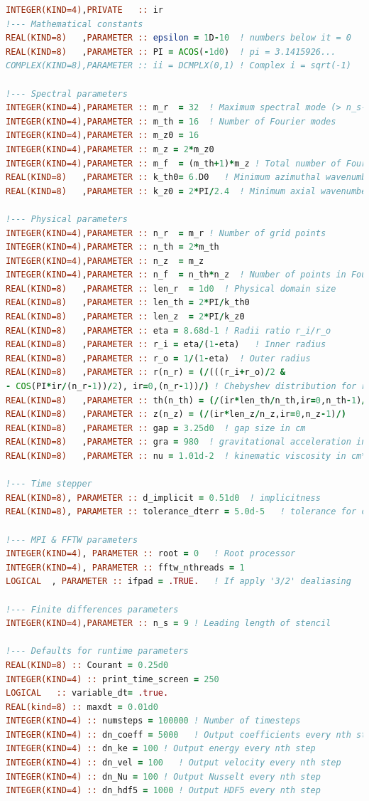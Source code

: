 \documentclass[a4paper, 11pt, DIV=11]{scrartcl}
\begin{document}
\begin{lstlisting}[language=Fortran]
INTEGER(KIND=4),PRIVATE   :: ir
!--- Mathematical constants
REAL(KIND=8)   ,PARAMETER :: epsilon = 1D-10  ! numbers below it = 0
REAL(KIND=8)   ,PARAMETER :: PI = ACOS(-1d0)  ! pi = 3.1415926...
COMPLEX(KIND=8),PARAMETER :: ii = DCMPLX(0,1) ! Complex i = sqrt(-1)

!--- Spectral parameters
INTEGER(KIND=4),PARAMETER :: m_r  = 32  ! Maximum spectral mode (> n_s-1)
INTEGER(KIND=4),PARAMETER :: m_th = 16  ! Number of Fourier modes
INTEGER(KIND=4),PARAMETER :: m_z0 = 16
INTEGER(KIND=4),PARAMETER :: m_z = 2*m_z0
INTEGER(KIND=4),PARAMETER :: m_f  = (m_th+1)*m_z ! Total number of Fourier modes
REAL(KIND=8)   ,PARAMETER :: k_th0= 6.D0   ! Minimum azimuthal wavenumber
REAL(KIND=8)   ,PARAMETER :: k_z0 = 2*PI/2.4  ! Minimum axial wavenumber

!--- Physical parameters
INTEGER(KIND=4),PARAMETER :: n_r  = m_r ! Number of grid points
INTEGER(KIND=4),PARAMETER :: n_th = 2*m_th
INTEGER(KIND=4),PARAMETER :: n_z  = m_z
INTEGER(KIND=4),PARAMETER :: n_f  = n_th*n_z  ! Number of points in Fourier directions
REAL(KIND=8)   ,PARAMETER :: len_r  = 1d0  ! Physical domain size
REAL(KIND=8)   ,PARAMETER :: len_th = 2*PI/k_th0
REAL(KIND=8)   ,PARAMETER :: len_z  = 2*PI/k_z0
REAL(KIND=8)   ,PARAMETER :: eta = 8.68d-1 ! Radii ratio r_i/r_o
REAL(KIND=8)   ,PARAMETER :: r_i = eta/(1-eta)   ! Inner radius
REAL(KIND=8)   ,PARAMETER :: r_o = 1/(1-eta)  ! Outer radius
REAL(KIND=8)   ,PARAMETER :: r(n_r) = (/(((r_i+r_o)/2 &
- COS(PI*ir/(n_r-1))/2), ir=0,(n_r-1))/) ! Chebyshev distribution for radial points
REAL(KIND=8)   ,PARAMETER :: th(n_th) = (/(ir*len_th/n_th,ir=0,n_th-1)/)
REAL(KIND=8)   ,PARAMETER :: z(n_z) = (/(ir*len_z/n_z,ir=0,n_z-1)/)
REAL(KIND=8)   ,PARAMETER :: gap = 3.25d0  ! gap size in cm
REAL(KIND=8)   ,PARAMETER :: gra = 980  ! gravitational acceleration in g/cm**3
REAL(KIND=8)   ,PARAMETER :: nu = 1.01d-2  ! kinematic viscosity in cm**2 /s

!--- Time stepper
REAL(KIND=8), PARAMETER :: d_implicit = 0.51d0  ! implicitness
REAL(KIND=8), PARAMETER :: tolerance_dterr = 5.0d-5   ! tolerance for corrector step

!--- MPI & FFTW parameters
INTEGER(KIND=4), PARAMETER :: root = 0   ! Root processor
INTEGER(KIND=4), PARAMETER :: fftw_nthreads = 1
LOGICAL  , PARAMETER :: ifpad = .TRUE.   ! If apply '3/2' dealiasing

!--- Finite differences parameters
INTEGER(KIND=4),PARAMETER :: n_s = 9 ! Leading length of stencil

!--- Defaults for runtime parameters
REAL(KIND=8) :: Courant = 0.25d0
INTEGER(KIND=4) :: print_time_screen = 250
LOGICAL   :: variable_dt= .true.
REAL(kind=8) :: maxdt = 0.01d0
INTEGER(KIND=4) :: numsteps = 100000 ! Number of timesteps
INTEGER(KIND=4) :: dn_coeff = 5000   ! Output coefficients every nth step
INTEGER(KIND=4) :: dn_ke = 100 ! Output energy every nth step
INTEGER(KIND=4) :: dn_vel = 100   ! Output velocity every nth step
INTEGER(KIND=4) :: dn_Nu = 100 ! Output Nusselt every nth step
INTEGER(KIND=4) :: dn_hdf5 = 1000 ! Output HDF5 every nth step
\end{lstlisting}
\end{document}

